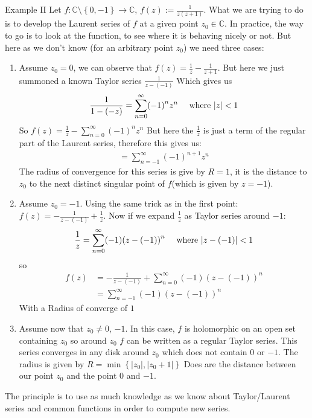 \begin{parag}{Example II}
    Let $f : \mathbb{C}\setminus \left\{0, -1\right\} \to \mathbb{C}$, $f\left(z\right) := \frac{1}{z\left(z + 1\right)}$. What we are trying to do is to develop the Laurent series of $f$ at a given point $z_0 \in \mathbb{C}$. In practice, the way to go is to look at the function, to see where it is behaving nicely or not. But here as we don't know (for an arbitrary point $z_0$) we need three cases:
	\begin{enumerate}
	    \item Assume $z_0 = 0$, we can observe that $f\left(z\right) = \frac{1}{z} - \frac{1}{z + 1}$. But here we just summoned a known Taylor series $\frac{1}{z - \left(-1\right)}$ Which gives us
			\begin{align*} 
				\frac{1}{1 - \left(-z\right)} = \sum_{n= 0}^{\infty}\left(-1\right)^{n}z^{n} \mathspace \text{ where } \left|z\right| < 1
			\end{align*}
			So $f\left(z\right) = \frac{1}{z} - \sum_{n= 0}^{\infty}\left(-1\right)^{n}z^{n}$ But here the $\frac{1}{z}$ is just a term of the regular part of the Laurent series, therefore this gives us:
			\begin{align*} 
				=  \sum_{n= -1}^{\infty}\left(-1\right)^{n + 1}z^{n}
			\end{align*}
			The radius of convergence for this series is give by $R= 1$, it is the distance to $z_0$ to the next distinct singular point of $f$(which is given by $z = -1$).
			\item  Assume $z_0 = -1$. Using the same trick as in the first point: $f\left(z\right) = -\frac{1}{z - \left(-1\right)} + \frac{1}{z}$. Now if we expand $\frac{1}{z}$ as Taylor series around $-1$:
				\begin{align*} 
					\frac{1}{z} = \sum_{n= 0}^{\infty}\left(-1\right)\left(z - \left(-1\right)\right)^{n} \mathspace \text{ where } \left|z - \left(-1\right)\right| < 1
				\end{align*}
				so 
				\begin{align*} 
					f\left(z\right) &= -\frac{1}{z - \left(-1\right)} + \sum_{n= 0}^{\infty}\left(-1\right)\left(z - \left(-1\right)\right)^{n}\\
					&= \sum_{n= -1}^{\infty}\left(-1\right)\left(z - \left(-1\right)\right)^{n}
				\end{align*}
				With a Radius of converge of $1$
				\item Assume now that $z_0 \neq 0$, $-1$. In this case, $f$ is holomorphic on an open set  containing $z_0$ so around $z_0$ $f$ can be written as a regular Taylor series. This series converges in any disk around $z_0$ which does not contain $0$ or $-1$. The radius is given by $R =  \min\left\{ \left|z_0\right|, \left|z_0 + 1\right|\right\}$ Does are the distance between our point $z_0$ and the point $0$ and $-1$.
	\end{enumerate}
	The principle is to use as much knowledge as we know about Taylor/Laurent series and common functions in order to compute new series.
\end{parag}



